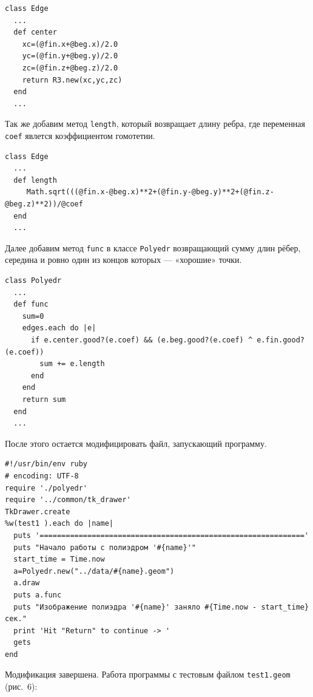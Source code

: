 \begin{small}
\begin{verbatim}
class Edge
  ...
  def center
    xc=(@fin.x+@beg.x)/2.0 
    yc=(@fin.y+@beg.y)/2.0
    zc=(@fin.z+@beg.z)/2.0
    return R3.new(xc,yc,zc)
  end
  ...
\end{verbatim}
\end{small}


Так же добавим метод \texttt{length}, который возвращает длину ребра, где переменная \texttt{coef} явлется коэффициентом гомотетии.

\begin{small}
\begin{verbatim}
class Edge
  ...
  def length 
     Math.sqrt(((@fin.x-@beg.x)**2+(@fin.y-@beg.y)**2+(@fin.z-@beg.z)**2))/@coef
  end
  ...
\end{verbatim}
\end{small}

Далее добавим метод \texttt{func} в классе \texttt{Polyedr} возвращающий сумму длин рёбер, середина и ровно один из концов которых — «хорошие» точки.

\begin{small}
\begin{verbatim}
class Polyedr
  ...
  def func 
    sum=0
    edges.each do |e|
      if e.center.good?(e.coef) && (e.beg.good?(e.coef) ^ e.fin.good?(e.coef))
        sum += e.length
      end
    end
    return sum
  end
  ...
\end{verbatim}
\end{small}

После этого остается модифицировать файл, запускающий программу.

\begin{small}
\begin{verbatim}
#!/usr/bin/env ruby
# encoding: UTF-8
require './polyedr'
require '../common/tk_drawer'
TkDrawer.create
%w(test1 ).each do |name|
  puts '============================================================='
  puts "Начало работы с полиэдром '#{name}'"
  start_time = Time.now
  a=Polyedr.new("../data/#{name}.geom")
  a.draw 
  puts a.func
  puts "Изображение полиэдра '#{name}' заняло #{Time.now - start_time} сек."
  print 'Hit "Return" to continue -> '
  gets
end

\end{verbatim}
\end{small}

Модификация завершена. Работа программы с тестовым файлом \texttt{test1.geom} (рис.~6):

